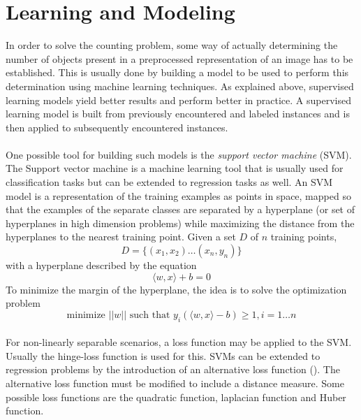 \bigskip

\goodbreak

\section{Learning and Modeling}
In order to solve the counting problem, some way of actually determining the number of objects present in a preprocessed representation of an image has to be established. This is usually done by building a model to be used to perform this determination using machine learning techniques. As explained above, supervised learning models yield better results and perform better in practice. A supervised learning model is built from previously encountered and labeled instances and is then applied to subsequently encountered instances.\\ \\
%
One possible tool for building such models is the \textit{support vector machine} (SVM). The Support vector machine is a machine learning tool that is usually used for classification tasks but can be extended to regression tasks as well. An SVM model is a representation of the training examples as points in space, mapped so that the examples of the separate classes are separated by a hyperplane (or set of hyperplanes in high dimension problems) while maximizing the distance from the hyperplanes to the nearest training point. Given a set $D$ of $n$ training points, 
\begin{equation}
D = \{(x_1, x_2)  \ldots  (x_n, y_n)\}
\end{equation}
with a hyperplane described by the equation
\begin{equation}
\langle w,x \rangle + b = 0
\end{equation}
To minimize the margin of the hyperplane, the idea is to solve the optimization problem
\begin{equation}
\text{minimize }||w||\text{ such that }y_i(\langle w,x \rangle - b) \ge 1, i = 1  \ldots  n 
\end{equation}\\
%
For non-linearly separable scenarios, a loss function may be applied to the SVM. Usually the hinge-loss function is used for this. SVMs can be extended to regression problems by the introduction of an alternative loss function (\cite{REF19}). The alternative loss function must be modified to include a distance measure. Some possible loss functions are the quadratic function, laplacian function and Huber function.\\ \\
